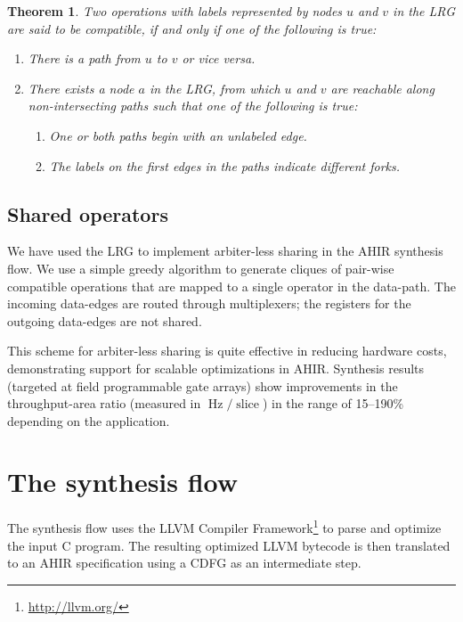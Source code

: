 \documentclass[conference]{IEEEtran}
\newtheorem{theorem}{Theorem}[section]
\begin{document}
\begin{theorem}

  Two operations with labels represented by nodes $u$ and $v$ in the
  LRG are said to be compatible, if and only if one of the following
  is true:

\begin{enumerate}
  \item There is a path from $u$ to $v$ or \emph{vice versa}.
  \item There exists a node $a$ in the LRG, from which $u$ and $v$ are
        reachable along non-intersecting paths such that one of the
        following is true:
    \begin{enumerate}
      \item One or both paths begin with an unlabeled edge.
      \item The labels on the first edges in the paths indicate
            different forks.
    \end{enumerate}
\end{enumerate}
\label{theorem:compatibility-LRG}
\end{theorem}

\subsection{Shared operators}

We have used the LRG to implement arbiter-less sharing in the AHIR
synthesis flow. We use a simple greedy algorithm to generate cliques
of pair-wise compatible operations that are mapped to a single
operator in the data-path. The incoming data-edges are routed through
multiplexers; the registers for the outgoing data-edges are not
shared.

This scheme for arbiter-less sharing is quite effective in reducing
hardware costs, demonstrating support for scalable optimizations in
AHIR. Synthesis results (targeted at field programmable gate arrays)
show improvements in the throughput-area ratio
(measured in $\operatorname{Hz}/\operatorname{slice}$) in the range of
15--190\% depending on the application\cite{ahir_thesis}.

\section{The synthesis flow}

The synthesis flow uses the LLVM Compiler
Framework\footnote{\url{http://llvm.org/}} to parse and optimize the
input C program. The resulting optimized LLVM bytecode is then
translated to an AHIR specification using a CDFG as an intermediate
step.
\end{document}
